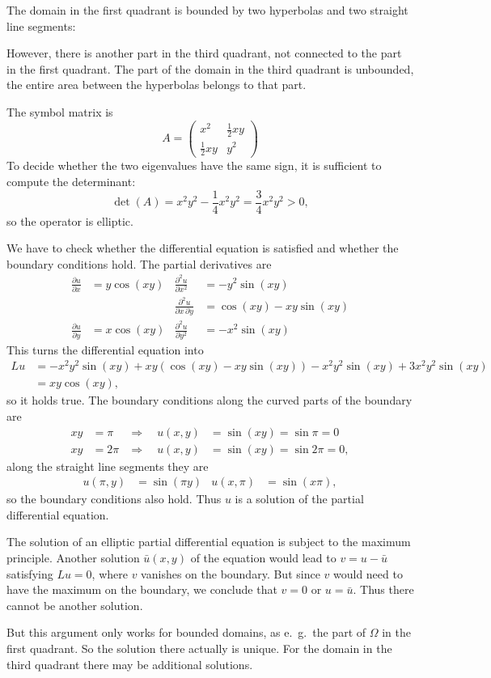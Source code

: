 \begin{loesung}
\begin{teilaufgaben}
\item
The domain in the first quadrant is bounded by two hyperbolas and
two straight line segments:
\begin{center}
\end{center}
However, there is another part in the third quadrant, not connected to
the part in the first quadrant.
The part of the domain in the third quadrant is unbounded, the entire
area between the hyperbolas belongs to that part.
\item
The symbol matrix is
\[
A=\begin{pmatrix}
x^2&\frac12xy\\
\frac12xy&y^2
\end{pmatrix}
\]
To decide whether the two eigenvalues have the same sign, it is sufficient
to compute the determinant:
\[
\det(A)=x^2y^2-\frac14x^2y^2=\frac34x^2y^2>0,
\]
so the operator is elliptic.
\item
We have to check whether the differential equation is satisfied and 
whether the boundary conditions hold.
The partial derivatives are
\begin{align*}
\frac{\partial u}{\partial x}&=y\cos(xy)
&
\frac{\partial^2 u}{\partial x^2}&=-y^2\sin(xy)
\\
&&\frac{\partial^2 u}{\partial x\,\partial y}&=\cos(xy)-xy\sin(xy)
\\
\frac{\partial u}{\partial y}&=x\cos(xy)
&
\frac{\partial^2 u}{\partial y^2}&=-x^2\sin(xy)
\end{align*}
This turns the differential equation into
\begin{align*}
Lu&=-x^2y^2\sin(xy)+xy(\cos(xy)-xy\sin(xy))-x^2y^2\sin(xy)+3x^2y^2\sin(xy)\
\\
&=xy\cos(xy),
\end{align*}
so it holds true.
The boundary conditions along the curved parts of the boundary are
\begin{align*}
xy&=\pi&\Rightarrow\quad u(x,y)&=\sin(xy)=\sin\pi=0\\
xy&=2\pi&\Rightarrow\quad u(x,y)&=\sin(xy)=\sin2\pi=0,
\end{align*}
along the straight line segments they are
\begin{align*}
u(\pi,y)&=\sin(\pi y)
&u(x,\pi)&=\sin(x\pi),
\end{align*}
so the boundary conditions also hold.
Thus $u$ is a solution of the partial differential equation.
\item
The solution of an elliptic partial differential equation is subject to
the maximum principle.
Another solution $\bar u(x,y)$ of the equation would lead to
$v=u-\bar u$ satisfying $Lu=0$, where $v$ vanishes on the boundary.
But since $v$ would need to have the maximum on the boundary, we 
conclude that $v=0$ or $u=\bar{u}$.
Thus there cannot be another solution.

But this argument only works for bounded domains, as e.~g.~the part of
$\Omega$ in the first quadrant.
So the solution there actually is unique.
For the domain in the third quadrant there may be additional solutions.
\qedhere
\end{teilaufgaben}
\end{loesung}
